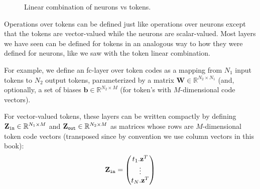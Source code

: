 \begin{figure}[h]
{\begin{minipage}{.49\linewidth}
\end{minipage}
}
\caption{Linear combination of neurons vs tokens.}
\end{figure}

Operations over tokens can be defined just like operations over neurons except that the tokens are vector-valued while the neurons are scalar-valued. Most layers we have seen can be defined for tokens in an analogous way to how they were defined for neurons, like we saw with the token linear combination. %

For example, we define an fc-layer over token codes as a mapping from $N_1$ input tokens to $N_2$ output tokens, parameterized by a matrix $\mathbf{W} \in \mathbb{R}^{N_2 \times N_1}$ (and, optionally, a set of biases $\mathbf{b} \in \mathbb{R}^{N_2 \times M}$ (for token's with $M$-dimensional code vectors).

For vector-valued tokens, these layers can be written compactly by defining $\mathbf{Z}_{\texttt{in}} \in \mathbb{R}^{N_1 \times M}$ and $\mathbf{Z}_{\texttt{out}} \in \mathbb{R}^{N_2 \times M}$ as matrices whose rows are $M$-dimensional token code vectors (transposed since by convention we use column vectors in this book): 
\begin{equation}
    \mathbf{Z}_{\texttt{in}} = 
     \begin{pmatrix}
        t_1.\mathbf{z}^T\\
        \vdots \\
        t_N.\mathbf{z}^T\\
    \end{pmatrix}
\end{equation}

